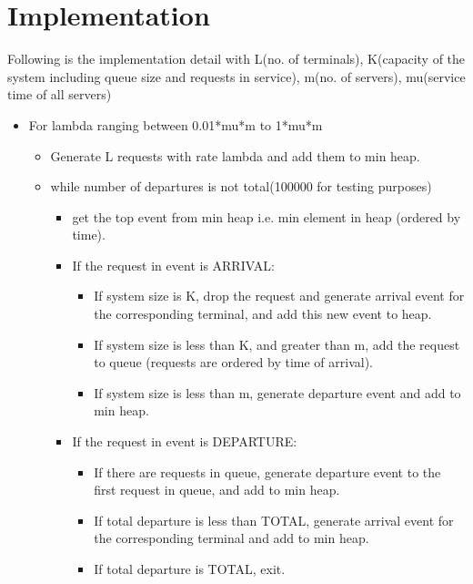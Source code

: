 \documentclass[11pt]{article}
\begin{document}
 \section{Implementation}
 Following is the implementation detail with L(no. of terminals), K(capacity of the system including queue size and requests in service), m(no. of servers), mu(service time of all servers)
 \begin{itemize}
 \item For lambda ranging between 0.01*mu*m to 1*mu*m
 
 \begin{itemize}
 \item Generate L requests with rate lambda and add them to min heap.
 \item while number of departures is not total(100000 for testing purposes)
 
 \begin{itemize}
 \item get the top event from min heap i.e. min element in heap (ordered by time).
 \item If the request in event is ARRIVAL:
 
 \begin{itemize}
 \item If system size is K, drop the request and generate arrival event for the corresponding terminal, and add this new event to heap.
 \item If system size is less than K, and greater than m, add the request to queue (requests are ordered by time of arrival).
 \item If system size is less than m, generate departure event and add to min heap.
 \end{itemize}
 
 \item If the request in event is DEPARTURE:
 
 \begin{itemize}
 \item If there are requests in queue, generate departure event to the first request in queue, and add to min heap.
 \item If total departure is less than TOTAL, generate arrival event for the corresponding terminal and add to min heap.
 \item If total departure is TOTAL, exit.
 \end{itemize}
 
 \end{itemize}
 \end{itemize}
 \end{itemize}
 
\end{document}
